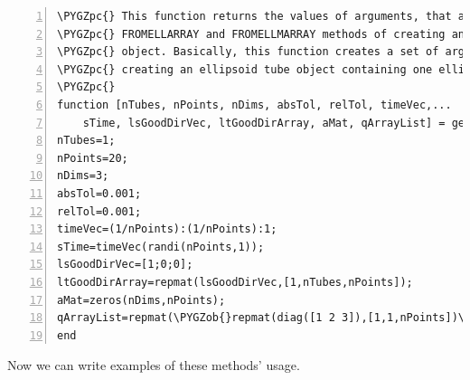 \documentclass[letterpaper,10pt,english]{sphinxmanual}
\def\PYGZob{\char`\{}
\def\PYGZcb{\char`\}}
\def\PYGZpc{\char`\%}
\begin{document}
\begin{Verbatim}[commandchars=\\\{\},numbers=left,firstnumber=1,stepnumber=1]
\PYGZpc{} This function returns the values of arguments, that are needed to use
\PYGZpc{} FROMELLARRAY and FROMELLMARRAY methods of creating an ellipsoid tube 
\PYGZpc{} object. Basically, this function creates a set of arguments nessesary for
\PYGZpc{} creating an ellipsoid tube object containing one ellipsoid tube.
\PYGZpc{}
function [nTubes, nPoints, nDims, absTol, relTol, timeVec,...
    sTime, lsGoodDirVec, ltGoodDirArray, aMat, qArrayList] = getDataForOneTube()
nTubes=1;
nPoints=20;
nDims=3;
absTol=0.001;
relTol=0.001;
timeVec=(1/nPoints):(1/nPoints):1;
sTime=timeVec(randi(nPoints,1));
lsGoodDirVec=[1;0;0];
ltGoodDirArray=repmat(lsGoodDirVec,[1,nTubes,nPoints]);
aMat=zeros(nDims,nPoints);
qArrayList=repmat(\PYGZob{}repmat(diag([1 2 3]),[1,1,nPoints])\PYGZcb{},1,nTubes);
end
\end{Verbatim}

Now we can write examples of these methods' usage.
\end{document}

